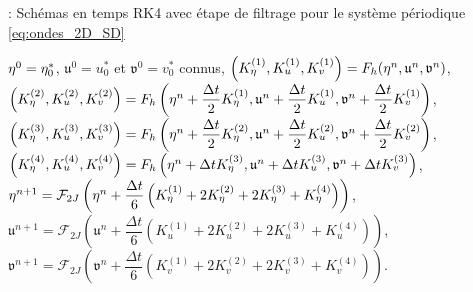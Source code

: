 \begin{center}
\begin{minipage}[H]{12cm}
  \begin{algorithm}[H]
    \caption{: Schémas en temps RK4 avec étape de filtrage pour le système périodique \eqref{eq:ondes_2D_SD}}\label{alg:RK4_ondes2d}
    \begin{algorithmic}[1]
    \State $\mathbf{\eta}^0 = \eta_0^*$, $\mathfrak{u}^0 = u_0^*$ et $\mathfrak{v}^0 = v_0^*$ connus,
             \State  $\left(K^{(1)}_{\eta}, K^{(1)}_{u}, K^{(1)}_{v}\right) = F_h(\mathbf{\eta}^n, \mathfrak{u}^n, \mathfrak{v}^n)$,
             \State  $\left(K^{(2)}_{\eta}, K^{(2)}_{u}, K^{(2)}_{v}\right) = F_h\left(\mathbf{\eta}^n + \dfrac{\Delta t}{2}K^{(1)}_{\eta}, \mathfrak{u}^n + \dfrac{\Delta t}{2}K^{(1)}_{u}, \mathfrak{v}^n + \dfrac{\Delta t}{2}K^{(1)}_{v}\right)$,
             \State   $\left(K^{(3)}_{\eta}, K^{(3)}_{u}, K^{(3)}_{v}\right) = F_h\left(\mathbf{\eta}^n + \dfrac{\Delta t}{2}K^{(2)}_{\eta}, \mathfrak{u}^n + \dfrac{\Delta t}{2}K^{(2)}_{u}, \mathfrak{v}^n + \dfrac{\Delta t}{2}K^{(2)}_{v}\right)$,
             \State   $\left(K^{(4)}_{\eta}, K^{(4)}_{u}, K^{(4)}_{v}\right) = F_h\left(\mathbf{\eta}^n + \Delta t K^{(3)}_{\eta}, \mathfrak{u}^n + \Delta tK^{(3)}_{u}, \mathfrak{v}^n + \Delta t K^{(3)}_{v}\right)$,
             \State  $\mathbf{\eta}^{n+1} = \mathcal{F}_{2J}\left( \mathbf{\eta}^n  + \dfrac{\Delta t}{6} \left( K^{(1)}_{\eta} + 2 K^{(2)}_{\eta} + 2 K^{(3)}_{\eta} + K^{(4)}_{\eta} \right) \right)$,
             \State  $\mathfrak{u}^{n+1} = \mathcal{F}_{2J}\left( \mathfrak{u}^n  + \dfrac{\Delta t}{6} \left( K^{(1)}_{u} + 2 K^{(2)}_{u} + 2 K^{(3)}_{u} + K^{(4)}_{u} \right) \right)$,
             \State  $\mathfrak{v}^{n+1} = \mathcal{F}_{2J}\left( \mathfrak{v}^n  + \dfrac{\Delta t}{6} \left( K^{(1)}_{v} + 2 K^{(2)}_{v} + 2 K^{(3)}_{v} + K^{(4)}_{v} \right) \right)$.
            \EndFor
    \end{algorithmic}
    \end{algorithm}
\end{minipage}
\end{center}











